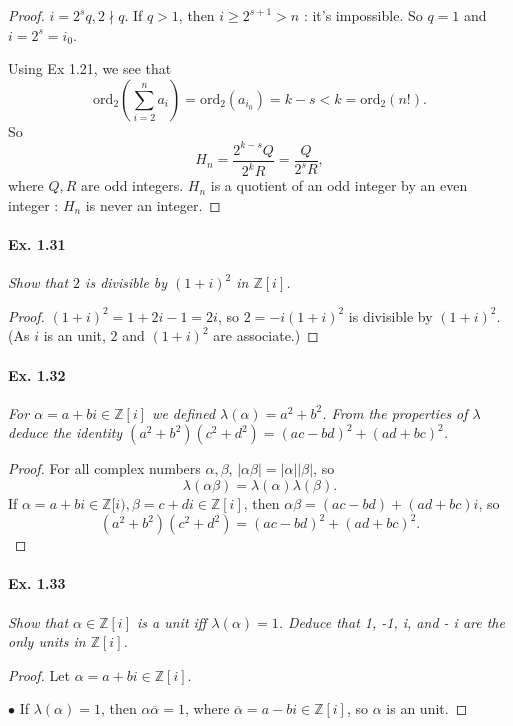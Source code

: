 \documentclass[11pt,a4paper]{article}
\newcommand{\Z}{\mathbb{Z}}
\newcommand{\ord}{\mathrm{ord}}
\begin{document}
{\begin{proof}
$i = 2^s q, 2 \nmid q$. If $q>1$, then $i\geq 2^{s+1}>n$ : it's impossible. So $q=1$ and $i = 2^s = i_0$.

Using Ex 1.21, we see that
$$\ord_2\left(\sum_{i=2}^n a_i \right)= \ord_2(a_{i_0}) = k - s < k = \ord_2(n!).$$
So $$H_n = \frac{2^{k-s} Q}{2^k R} = \frac{Q}{2^s R},$$ where $Q,R$ are odd integers. $H_n$ is a quotient of an odd integer by an even integer : $H_n$ is never an integer.
\end{proof}

\paragraph{Ex. 1.31}

{\it Show that $2$ is divisible by $(1+i)^2$ in $\Z[i]$.
}

\begin{proof}
$(1+i)^2 = 1 +2i - 1 = 2i$, so $2 = -i(1+i)^2$ is divisible by $(1+i)^2$.
(As $i$ is an unit, $2$ and $(1+i)^2$ are associate.)
\end{proof}

\paragraph{Ex. 1.32}

{\it
For $\alpha = a + bi \in \Z[i]$ we defined $\lambda(\alpha) =
a^2 + b^2$. From the properties of $\lambda$ deduce the identity $(a^2+ b^2)(c^2 + d^2) = (ac - bd)^2 + (ad + bc)^2$.
}

\begin{proof}
For all complex numbers $\alpha,\beta$, $\vert \alpha \beta\vert = \vert \alpha\vert \vert \beta\vert$, so
$$\lambda (\alpha \beta) = \lambda(\alpha) \lambda(\beta).$$
If $\alpha = a+bi \in \Z[i), \beta = c + d i \in \Z[i]$, then $\alpha \beta = (ac - bd) + (ad +bc)i$, so
$$(a^2+ b^2)(c^2 + d^2) = (ac - bd)^2 + (ad + bc)^2.$$
\end{proof}

\paragraph{Ex. 1.33}

{\it Show that $\alpha \in \Z[i]$ is a unit iff  $\lambda(\alpha) = 1$. Deduce that 1, -1, i, and - i are the only units in $\Z[i]$.
}

\begin{proof}
Let $\alpha = a+bi \in \Z[i]$.

$\bullet$ If $\lambda(\alpha) = 1$, then $\alpha \overline{\alpha} = 1$, where $\overline{\alpha} = a-bi \in \Z[i]$, so $\alpha$ is an unit.


\end{proof}}
\end{document}
